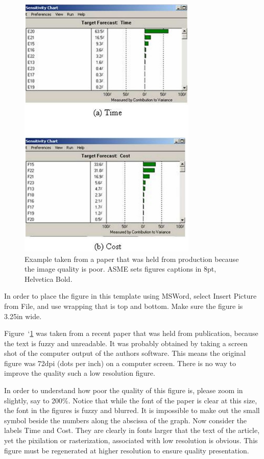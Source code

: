\documentclass[twocolumn,10pt,cleanfoot]{asme2ej}
\begin{document}
\begin{figure} 
\centerline{\includegraphics[width=3.34in]{figure/FMANU_MD_05_1107_11.jpg}}
\caption{Example taken from a paper that was held from production because the image quality is poor.  ASME sets figures captions in 8pt, Helvetica Bold.}
\label{fig_example1.jpg}
\end{figure}

In order to place the figure in this template using MSWord, select Insert Picture from File, and use wrapping that is top and bottom. Make sure the figure is 3.25in wide.
 
Figure~`\ref{fig_example1.jpg}
was taken from a recent paper that was held from publication, because the text is fuzzy and unreadable. It was probably obtained by taking a screen shot of the computer output of the authors software. This means the original figure was 72dpi (dots per inch) on a computer screen. There is no way to improve the quality such a low resolution figure.
 
In order to understand how poor the quality of this figure is, please zoom in slightly, say to 200\%.  Notice that while the font of the paper is clear at this size, the font in the figures is fuzzy and blurred.  It is impossible to make out the small symbol beside the numbers along the abscissa of the graph.  Now consider the labels Time and Cost. They are clearly in fonts larger that the text of the article, yet the pixilation or rasterization, associated with low resolution is obvious. This figure must be regenerated at higher resolution to ensure quality presentation.
\end{document}
